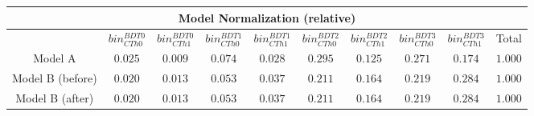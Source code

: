 \begin{table}
\centering
\begin{tabular}{|c||c|c|c|c|c|c|c|c|c|}
\hline
\multicolumn{10}{|c|}{Model Normalization (relative)} \\ 
\hline
 & $bin^{BDT 0}_{CTh 0}$ & $bin^{BDT 0}_{CTh 1}$ & $bin^{BDT 1}_{CTh 0}$ & $bin^{BDT 1}_{CTh 1}$ & $bin^{BDT 2}_{CTh 0}$ & $bin^{BDT 2}_{CTh 1}$ & $bin^{BDT 3}_{CTh 0}$ & $bin^{BDT 3}_{CTh 1}$ & Total \\ 
\hline
\hline
Model A &$   0.025$ & $   0.009$ & $   0.074$ & $   0.028$ & $   0.295$ & $   0.125$ & $   0.271$ & $   0.174$ & $   1.000$ \\
Model B (before) &$   0.020$ & $   0.013$ & $   0.053$ & $   0.037$ & $   0.211$ & $   0.164$ & $   0.219$ & $   0.284$ & $   1.000$ \\
Model B (after) &$   0.020$ & $   0.013$ & $   0.053$ & $   0.037$ & $   0.211$ & $   0.164$ & $   0.219$ & $   0.284$ & $   1.000$ \\
\hline
\end{tabular}
\end{table}
